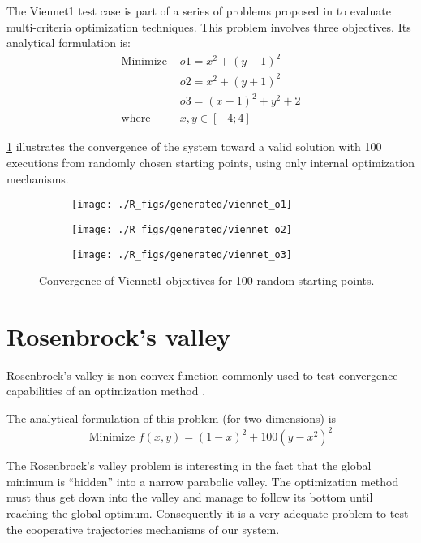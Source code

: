 The Viennet1 test case is part of a series of problems proposed in \cite{viennet1996multicriteria} to evaluate multi-criteria optimization techniques. This problem involves three objectives. Its analytical formulation is:
\begin{align*}
\text{Minimize } 	&o1 = x^2 + (y-1)^2 \\
								&o2 = x^2 + (y+1)^2 \\
								&o3 = (x-1)^2 + y^2 +2\\
\text{where } 		&x, y \in [-4;4]						
\end{align*}				

\figurename{} \ref{viennet_res} illustrates the convergence of the system toward a valid solution with 100 executions from randomly chosen starting points, using only internal optimization mechanisms.

\begin{figure}[h]

	\begin{subfigure}[b]{0.32\textwidth}
		\centering
		\texttt{[image: ./R\_figs/generated/viennet\_o1]}	
	\end{subfigure}
	\hfill%
	\begin{subfigure}[b]{0.32\textwidth}
		\centering
		\texttt{[image: ./R\_figs/generated/viennet\_o2]}	
	\end{subfigure}
	\hfill%
	\begin{subfigure}[b]{0.32\textwidth}
		\centering
		\texttt{[image: ./R\_figs/generated/viennet\_o3]}	
	\end{subfigure}
	\caption{Convergence of Viennet1 objectives for 100 random starting points.}
	\label{viennet_res}
\end{figure}

\section{Rosenbrock's valley}

Rosenbrock's valley is non-convex function commonly used to test convergence capabilities of an optimization method \cite{Rosenbrock01011960}.

The analytical formulation of this problem (for two dimensions) is 
$$\text{Minimize } f(x,y) = (1-x)^2 + 100(y - x^2)^2$$

The Rosenbrock's valley problem is interesting in the fact that the global minimum is \enquote{hidden} into a narrow parabolic valley. The optimization method must thus get down into the valley and manage to follow its bottom until reaching the global optimum. Consequently it is a very adequate problem to test the cooperative trajectories mechanisms of our system.

